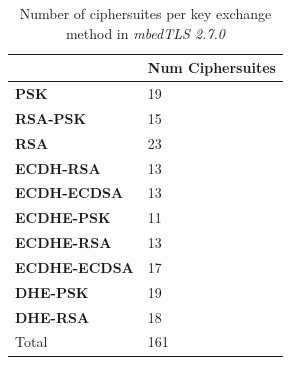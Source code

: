 \documentclass{llncs}
\begin{document}
\begin{table}[]
\begin{tabular}{ll}
\hline
\multicolumn{1}{|l|}{}                     & \multicolumn{1}{l|}{\textbf{Num Ciphersuites}} \\ \hline
\multicolumn{1}{|l|}{\textbf{PSK}}         & \multicolumn{1}{l|}{19}                        \\ \hline
\multicolumn{1}{|l|}{\textbf{RSA-PSK}}     & \multicolumn{1}{l|}{15}                        \\ \hline
\multicolumn{1}{|l|}{\textbf{RSA}}         & \multicolumn{1}{l|}{23}                        \\ \hline
\multicolumn{1}{|l|}{\textbf{ECDH-RSA}}    & \multicolumn{1}{l|}{13}                        \\ \hline
\multicolumn{1}{|l|}{\textbf{ECDH-ECDSA}}  & \multicolumn{1}{l|}{13}                        \\ \hline
\multicolumn{1}{|l|}{\textbf{ECDHE-PSK}}   & \multicolumn{1}{l|}{11}                        \\ \hline
\multicolumn{1}{|l|}{\textbf{ECDHE-RSA}}   & \multicolumn{1}{l|}{13}                        \\ \hline
\multicolumn{1}{|l|}{\textbf{ECDHE-ECDSA}} & \multicolumn{1}{l|}{17}                        \\ \hline
\multicolumn{1}{|l|}{\textbf{DHE-PSK}}     & \multicolumn{1}{l|}{19}                        \\ \hline
\multicolumn{1}{|l|}{\textbf{DHE-RSA}}     & \multicolumn{1}{l|}{18}                        \\ \hline
Total                                      & 161                                           
\end{tabular}
\centering
\centering \caption{\label{table:mbedtls-num-ciphers} Number of ciphersuites per key exchange method in \textit{mbedTLS 2.7.0}}
\end{table}
\end{document}
